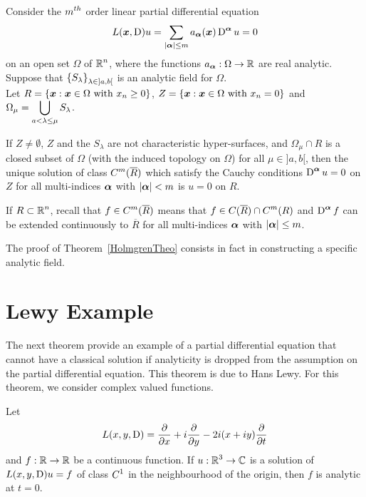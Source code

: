 \begin{theorem}[Holmgren]
Consider the $\displaystyle m^{th}$ order linear partial differential equation
\[
L({\bm{x}}, \operatorname{D})u = \sum_{|{\bm{\alpha}}|\leq m}
a_{{\bm{\alpha}}}({\bm{x}}) \operatorname{D}^{{\bm{\alpha}}} u = 0
\]
on an open set $\Omega$ of $\displaystyle \mathbb{R}^n$, where the functions
$a_{{\bm{\alpha}}}:\Omega\rightarrow \mathbb{R}$ are real analytic. Suppose that
$\displaystyle \left\{ S_\lambda \right\}_{\lambda \in ]a,b[}$ is an
analytic field for $\Omega$.\\
Let
$\displaystyle
R = \left\{ {\bm{x}} : {\bm{x}} \in \Omega \ \text{with} \ x_n\geq 0 \right\}$,
$\displaystyle
Z = \left\{ {\bm{x}} : {\bm{x}} \in \Omega \ \text{with} \ x_n = 0 \right\}$
and
$\displaystyle \Omega_\mu = \bigcup_{a<\lambda \leq \mu} S_\lambda$.

If $Z \neq \emptyset$, $Z$ and the $S_\lambda$ are not characteristic
hyper-surfaces, and
$\Omega_\mu \cap R$ is a closed subset of $\Omega$ (with
the induced topology on $\Omega$) for all $\mu \in ]a,b[$, then the
unique solution of class $\displaystyle C^m(\overline{R})$ which
satisfy the Cauchy conditions $\displaystyle \operatorname{D}^{{\bm{\alpha}}} u = 0$ on
$Z$ for all multi-indices ${\bm{\alpha}}$ with $|{\bm{\alpha}}|<m$
is $u=0$ on $R$.
\end{theorem}

If $\displaystyle R\subset \mathbb{R}^n$, recall that
$\displaystyle f \in C^m(\overline{R})$ means that
$\displaystyle f\in C(\overline{R}) \cap C^m(R)$ and
$\displaystyle \operatorname{D}^{{\bm{\alpha}}} f$ can be extended
continuously to $\overline{R}$ for all multi-indices ${\bm{\alpha}}$ with
$|{\bm{\alpha}}|\leq m$.

The proof of Theorem~\ref{HolmgrenTheo} consists in fact in
constructing a specific analytic field.

\section{Lewy Example}

The next theorem provide an example of a partial differential equation
that cannot have a classical solution  if analyticity is dropped from
the assumption on the partial differential equation.  This theorem is
due to Hans Lewy.  For this theorem, we consider complex valued
functions.

\begin{theorem}[Lewy] \label{Lewy}
Let
\[
L(x,y,\operatorname{D}) = \frac{\partial{}}{\partial x} + i \frac{\partial{}}{\partial y} - 2i(x+iy)\frac{\partial{}}{\partial t}
\]
and $f:\mathbb{R}\to \mathbb{R}$ be a continuous function.  If
$\displaystyle u:\mathbb{R}^3\to \mathbb{C}$ is a
solution of $L(x,y,\operatorname{D})u = f$ of class $\displaystyle C^1$ in the
neighbourhood of the origin, then $f$ is analytic at $t=0$.
\end{theorem}

